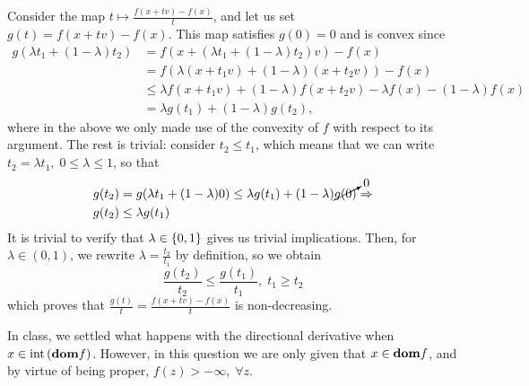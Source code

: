 \documentclass[10pt]{article}
\begin{document}
\begin{Exercise}
	\label{ex:p4}
	\ExePart

	Consider the map $t \mapsto \frac{f(x + tv) - f(x)}{t}$, and let us set
	$g(t) = f(x + tv) - f(x)$. This map satisfies $g(0) = 0$ and is convex since
	\begin{align*}
		g(\lambda t_1 + (1 - \lambda) t_2) &=
		f\left(x + (\lambda t_1 + (1 - \lambda) t_2) v \right) - f(x) \\
		&= f(\lambda (x + t_1 v) + (1 - \lambda) (x + t_2 v)) - f(x) \\
		&\leq \lambda f(x + t_1 v) + (1 - \lambda) f(x + t_2 v)
			- \lambda f(x) - (1 - \lambda) f(x) \\
		&= \lambda g(t_1) + (1 - \lambda) g(t_2),
	\end{align*}
	where in the above we only made use of the convexity of $f$ with respect to
	its argument. The rest is trivial: consider $t_2 \leq t_1$, which means that
	we can write $t_2 = \lambda t_1, \; 0 \leq \lambda \leq 1$, so that
	\begin{align*}
		g(t_2) &= g(\lambda t_1 + (1 - \lambda) 0) \leq
			\lambda g(t_1) + (1 - \lambda) \cancelto{0}{g(0)} \Rightarrow \\
			g(t_2) &\leq \lambda g(t_1)
	\end{align*}
	It is trivial to verify that $\lambda \in \left\{ 0, 1 \right\}$ gives us trivial
	implications. Then, for $\lambda \in (0, 1)$, we rewrite $\lambda =
	\frac{t_2}{t_1}$ by definition, so we obtain
	\[
		\frac{g(t_2)}{t_2} \leq \frac{g(t_1)}{t_1}, \; t_1 \geq t_2
	\]
	which proves that $\frac{g(t)}{t} = \frac{f(x + tv) - f(x)}{t}$ is
	non-decreasing.

	\ExePart
    In class, we settled what happens with the directional derivative when
    $x \in \mathrm{int}\left( \textbf{dom} f \right)$. However, in this question we are only given that
    $x \in \textbf{dom} f$, and by virtue of being proper, $f(z) > -\infty, \; \forall
    z$.


\end{Exercise}
\end{document}
